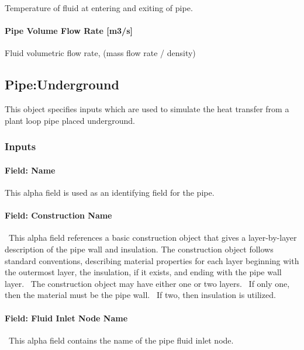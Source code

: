 Temperature of fluid at entering and exiting of pipe.

\paragraph{Pipe Volume Flow Rate {[}m3/s{]}}\label{pipe-volume-flow-rate-m3s-1}

Fluid volumetric flow rate, (mass flow rate / density)

\subsection{Pipe:Underground}\label{pipeunderground}

This object specifies inputs which are used to simulate the heat transfer from a plant loop pipe placed underground.

\subsubsection{Inputs}\label{inputs-8-012}

\paragraph{Field: Name}\label{field-name-8-010}

This alpha field is used as an identifying field for the pipe.

\paragraph{Field: Construction Name}\label{field-construction-name-2-000}

~This alpha field references a basic construction object that gives a layer-by-layer description of the pipe wall and insulation. The construction object follows standard conventions, describing material properties for each layer beginning with the outermost layer, the insulation, if it exists, and ending with the pipe wall layer.~ The construction object may have either one or two layers.~ If only one, then the material must be the pipe wall.~ If two, then insulation is utilized.

\paragraph{Field: Fluid Inlet Node Name}\label{field-fluid-inlet-node-name-2}

~This alpha field contains the name of the pipe fluid inlet node.

